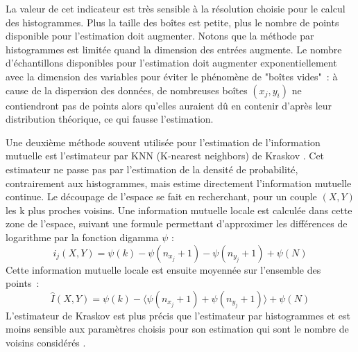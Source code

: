 \documentclass[../main]{subfiles}
\begin{document}
La valeur de cet indicateur est très sensible à la résolution choisie pour le calcul des histogrammes.
Plus la taille des boîtes est petite, plus le nombre de points disponible pour l'estimation doit augmenter.
Notons que la méthode par histogrammes est limitée quand la dimension des entrées augmente.
Le nombre d'échantillons disponibles pour l'estimation doit augmenter exponentiellement avec la dimension des variables pour éviter le phénomène de "boîtes vides"~: à cause de la dispersion des données, de nombreuses boîtes $(x_j,y_i)$ ne contiendront pas de points alors qu'elles auraient dû en contenir d'après leur distribution théorique, ce qui fausse l'estimation.

Une deuxième méthode souvent utilisée pour l'estimation de l'information mutuelle est l'estimateur par KNN (K-nearest neighbors) de Kraskov \cite{2004kraskov}.
Cet estimateur ne passe pas par l'estimation de la densité de probabilité, contrairement aux histogrammes, mais estime directement l'information mutuelle continue.
Le découpage de l'espace se fait en recherchant, pour un couple $(X,Y)$ les k plus proches voisins. Une information mutuelle locale est calculée dans cette zone de l'espace, suivant une formule permettant d'approximer les différences de logarithme par la fonction digamma $\psi$ : 
$$i_j(X,Y) = \psi(k) - \psi(n_{x_j} + 1) - \psi(n_{y_j} +1) + \psi(N)$$
Cette information mutuelle locale est ensuite moyennée sur l'ensemble des points~: 
$$\hat{I}(X,Y) = \psi(k) - \langle\psi(n_{x_j} + 1) + \psi(n_{y_j} +1)\rangle + \psi(N)$$
L'estimateur de Kraskov est plus précis que l'estimateur par histogrammes et est moins sensible aux paramètres choisis pour son estimation qui sont le nombre de voisins considérés \cite{ross_mutual_2014}.
\end{document}
